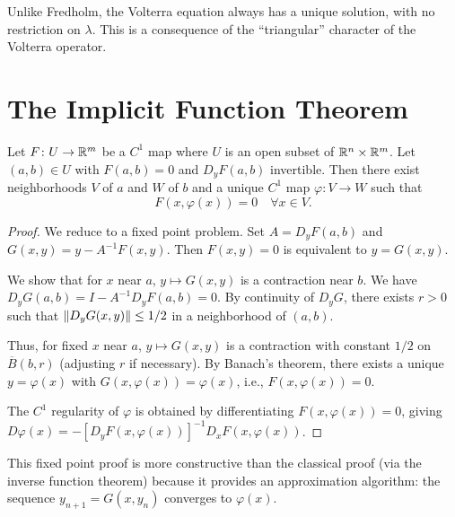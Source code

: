 \begin{attention}
Unlike Fredholm, the Volterra equation always has a unique solution, with no restriction on
$\lambda$. This is a consequence of the ``triangular'' character of the Volterra operator.
\end{attention}

\section{The Implicit Function Theorem}

\begin{theorem}
\label{thm:implicit}
Let $F\colon U \to \mathbb{R}^m$ be a $C^1$ map where $U$ is an open subset of $\mathbb{R}^n \times \mathbb{R}^m$.
Let $(a, b) \in U$ with $F(a, b) = 0$ and $D_y F(a, b)$ invertible. Then there exist
neighborhoods $V$ of $a$ and $W$ of $b$ and a unique $C^1$ map $\varphi\colon V \to W$
such that
\[
  F(x, \varphi(x)) = 0 \quad \forall x \in V.
\]
\end{theorem}

\begin{proof}
We reduce to a fixed point problem. Set $A = D_y F(a,b)$ and
$G(x,y) = y - A^{-1} F(x,y)$. Then $F(x,y) = 0$ is equivalent to $y = G(x,y)$.

We show that for $x$ near $a$, $y \mapsto G(x,y)$ is a contraction near $b$. We have
$D_y G(a,b) = I - A^{-1} D_y F(a,b) = 0$. By continuity of $D_y G$, there exists $r > 0$
such that $\left\| D_y G(x,y) \right\| \leq 1/2$ in a neighborhood of $(a,b)$.

Thus, for fixed $x$ near $a$, $y \mapsto G(x,y)$ is a contraction with constant $1/2$ on
$\overline{B}(b, r)$ (adjusting $r$ if necessary). By Banach's theorem, there exists a
unique $y = \varphi(x)$ with $G(x, \varphi(x)) = \varphi(x)$, i.e.,
$F(x, \varphi(x)) = 0$.

The $C^1$ regularity of $\varphi$ is obtained by differentiating $F(x, \varphi(x)) = 0$,
giving $D\varphi(x) = -[D_y F(x, \varphi(x))]^{-1} D_x F(x, \varphi(x))$.
\end{proof}

\begin{remark}
This fixed point proof is more constructive than the classical proof (via the inverse
function theorem) because it provides an approximation algorithm: the sequence
$y_{n+1} = G(x, y_n)$ converges to $\varphi(x)$.
\end{remark}

